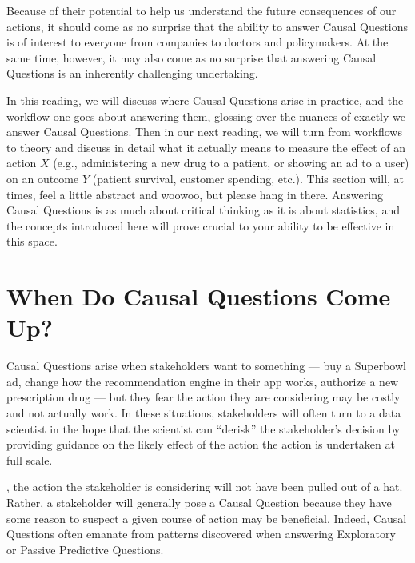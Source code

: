 \documentclass[letterpaper,10pt,english]{jupyterBook}
\begin{document}
\sphinxAtStartPar
Because of their potential to help us understand the future consequences of our actions, it should come as no surprise that the ability to answer Causal Questions is of  interest to everyone from companies to doctors and policymakers. At the same time, however, it may also come as no surprise that answering Causal Questions is an inherently challenging undertaking.

\sphinxAtStartPar
In this reading, we will discuss where Causal Questions arise in practice, and the workflow one goes about answering them, glossing over the nuances of  exactly we answer Causal Questions. Then in our next reading, we will turn from workflows to theory and discuss in detail what it actually means to measure the effect of an action \(X\) (e.g., administering a new drug to a patient, or showing an ad to a user) on an outcome \(Y\) (patient survival, customer spending, etc.). This section will, at times, feel a little abstract and woo\sphinxhyphen{}woo, but please hang in there. Answering Causal Questions is as much about critical thinking as it is about statistics, and the concepts introduced here will prove crucial to your ability to be effective in this space.




\section{When Do Causal Questions Come Up?}
\label{\detokenize{30_questions/30_using_causal_questions:when-do-causal-questions-come-up}}
\sphinxAtStartPar
Causal Questions arise when stakeholders want to  something — buy a Superbowl ad, change how the recommendation engine in their app works, authorize a new prescription drug — but they fear the action they are considering may be costly and not actually work. In these situations, stakeholders will often turn to a data scientist in the hope that the scientist can “de\sphinxhyphen{}risk” the stakeholder’s decision by providing guidance on the likely effect of the action  the action is undertaken at full scale.

\sphinxAtStartPar
{}, the action the stakeholder is considering will not have been pulled out of a hat. Rather, a stakeholder will generally pose a Causal Question because they have some reason to suspect a given course of action may be beneficial. Indeed, Causal Questions often emanate from patterns discovered when answering Exploratory or Passive Predictive Questions.
\end{document}
